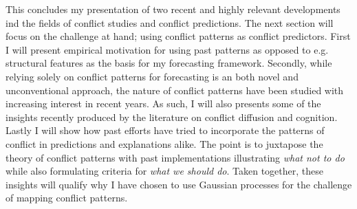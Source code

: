 \documentclass[a4paper]{article}
\begin{document}
This concludes my presentation of two recent and highly relevant developments ind the fields of conflict studies and conflict predictions. The next section will focus on the challenge at hand; using conflict patterns as conflict predictors. First I will present empirical motivation for using past patterns as opposed to e.g. structural features as the basis for my forecasting framework. Secondly, while relying solely on conflict patterns for forecasting is an both novel and unconventional approach, the nature of conflict patterns have been studied with increasing interest in recent years. As such, I will also presents some of the insights recently produced by the literature on conflict diffusion and cognition. Lastly I will show how past efforts have tried to incorporate the patterns of conflict in predictions and explanations alike. The point is to juxtapose the theory of conflict patterns with past implementations illustrating \emph{what not to do} while also formulating criteria for \emph{what we should do}. Taken together, these insights will qualify why I have chosen to use Gaussian processes for the challenge of mapping conflict patterns.\par


 
\end{document}
